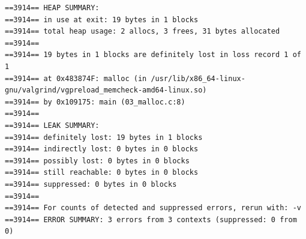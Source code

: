 \begin{verbatim}
==3914== HEAP SUMMARY:
==3914== in use at exit: 19 bytes in 1 blocks
==3914== total heap usage: 2 allocs, 3 frees, 31 bytes allocated
==3914==
==3914== 19 bytes in 1 blocks are definitely lost in loss record 1 of 1
==3914== at 0x483874F: malloc (in /usr/lib/x86_64-linux-gnu/valgrind/vgpreload_memcheck-amd64-linux.so)
==3914== by 0x109175: main (03_malloc.c:8)
==3914==
==3914== LEAK SUMMARY:
==3914== definitely lost: 19 bytes in 1 blocks
==3914== indirectly lost: 0 bytes in 0 blocks
==3914== possibly lost: 0 bytes in 0 blocks
==3914== still reachable: 0 bytes in 0 blocks
==3914== suppressed: 0 bytes in 0 blocks
==3914==
==3914== For counts of detected and suppressed errors, rerun with: -v
==3914== ERROR SUMMARY: 3 errors from 3 contexts (suppressed: 0 from 0)
\end{verbatim}
